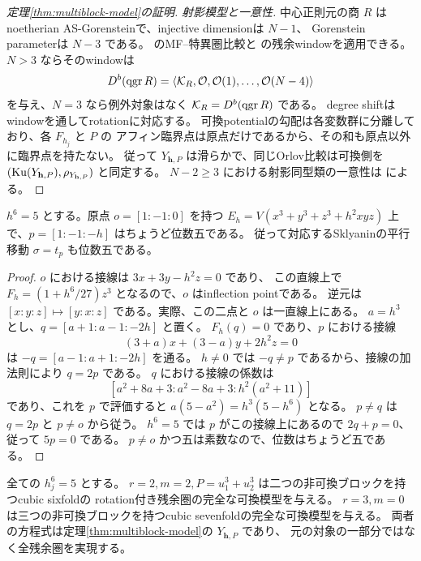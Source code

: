 \begin{proof}[定理\ref{thm:multiblock-model}の証明]
 \emph{射影模型と一意性.}
 中心正則元の商 \(R\) はnoetherian AS-Gorensteinで、injective dimensionは \(N-1\)、
 Gorenstein parameterは \(N-3\) である。
 \cite[Theorem 5.8]{CCKM} のMF--特異圏比較と
 \cite[Theorem 2.5]{Orlov} の残余windowを適用できる。
 \(N>3\) ならそのwindowは
 \[
 D^b(\operatorname{qgr} R)=\langle\mathcal K_R,\mathcal O,\mathcal O(1),\ldots,\mathcal O(N-4)\rangle
 \]
 を与え、\(N=3\) なら例外対象はなく \(\mathcal K_R=D^b(\operatorname{qgr} R)\) である。
 degree shiftはwindowを通してrotationに対応する。
 可換potentialの勾配は各変数群に分離しており、各 \(F_{h_j}\) と \(P\) の
 アフィン臨界点は原点だけであるから、その和も原点以外に臨界点を持たない。
 従って \(Y_{\mathbf h,P}\) は滑らかで、同じOrlov比較は可換側を
 \((\operatorname{Ku}(Y_{\mathbf h,P}),\rho_{Y_{\mathbf h,P}})\) と同定する。
 \(N-2\ge3\) における射影同型類の一意性は
 \cite[Theorem 1.7]{LZ} による。
\end{proof}

\begin{lemma}[位数五の明示的パラメータ]\label{lem:order-five}
 \(h^6=5\) とする。原点 \(o=[1:-1:0]\) を持つ
 \(E_h=V(x^3+y^3+z^3+h^2xyz)\) 上で、\(p=[1:-1:-h]\) はちょうど位数五である。
 従って対応するSklyaninの平行移動 \(\sigma=t_p\) も位数五である。
\end{lemma}
\begin{proof}
 \(o\) における接線は \(3x+3y-h^2z=0\) であり、
 この直線上で \(F_h=(1+h^6/27)z^3\) となるので、\(o\) はinflection pointである。
 逆元は \([x:y:z]\mapsto[y:x:z]\) である。実際、この二点と \(o\) は一直線上にある。
 \(a=h^3\) とし、\(q=[a+1:a-1:-2h]\) と置く。
 \(F_h(q)=0\) であり、\(p\) における接線
 \[
 (3+a)x+(3-a)y+2h^2z=0
 \]
 は \(-q=[a-1:a+1:-2h]\) を通る。
 \(h\ne0\) では \(-q\ne p\) であるから、接線の加法則により \(q=2p\) である。
 \(q\) における接線の係数は
 \[
 [a^2+8a+3:a^2-8a+3:h^2(a^2+11)]
 \]
 であり、これを \(p\) で評価すると \(a(5-a^2)=h^3(5-h^6)\) となる。
 \(p\ne q\) は \(q=2p\) と \(p\ne o\) から従う。
 \(h^6=5\) では \(p\) がこの接線上にあるので \(2q+p=0\)、従って \(5p=0\) である。
 \(p\ne o\) かつ五は素数なので、位数はちょうど五である。
\end{proof}

\begin{remark}
 全ての \(h_j^6=5\) とする。
 \(r=2,m=2,P=u_1^3+u_2^3\) は二つの非可換ブロックを持つcubic sixfoldの
 rotation付き残余圏の完全な可換模型を与える。
 \(r=3,m=0\) は三つの非可換ブロックを持つcubic sevenfoldの完全な可換模型を与える。
 両者の方程式は定理\ref{thm:multiblock-model}の \(Y_{\mathbf h,P}\) であり、
 元の対象の一部分ではなく全残余圏を実現する。
\end{remark}

